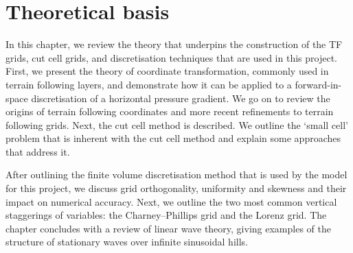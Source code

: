 \chapter{Theoretical basis}
\label{sec:theory}

In this chapter, we review the theory that underpins the construction of the TF grids, cut cell grids, and discretisation techniques that are used in this project.
First, we present the theory of coordinate transformation, commonly used in terrain following layers, and demonstrate how it can be applied to a forward-in-space discretisation of a horizontal pressure gradient.  We go on to review the origins of terrain following coordinates and more recent refinements to terrain following grids.  Next, the cut cell method is described.  We outline the `small cell' problem that is inherent with the cut cell method and explain some approaches that address it.

After outlining the finite volume discretisation method that is used by the model for this project, we discuss grid orthogonality, uniformity and skewness and their impact on numerical accuracy.   Next, we outline the two most common vertical staggerings of variables: the Charney--Phillips grid and the Lorenz grid.  The chapter concludes with a review of linear wave theory, giving examples of the structure of stationary waves over infinite sinusoidal hills.











